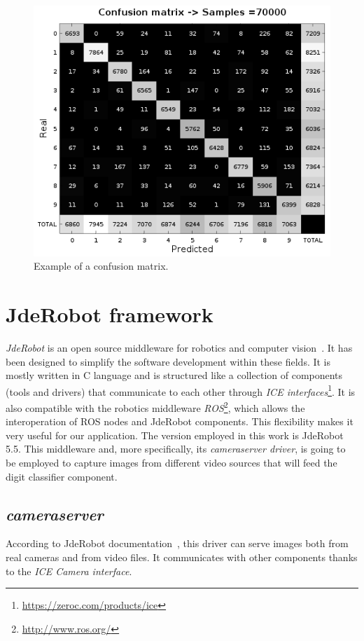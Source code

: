 \begin{figure}
	\centering
	\includegraphics[width=0.8\linewidth, keepaspectratio]{figures/conf_mat.png}
	\caption{Example of a confusion matrix.}
	\label{fig:conf_mat}
\end{figure}

\section{JdeRobot framework}\label{sec:jderobot}
\emph{JdeRobot} is an open source middleware for robotics and computer vision~\cite{jderobot}. It has been designed to simplify the software development within these fields. It is mostly written in C\nolinebreak[4]\hspace{-.05em}\raisebox{.4ex}{\tiny\bf ++} language and is structured like a collection of components (tools and drivers) that communicate to each other through \emph{ICE interfaces}\footnote{\url{https://zeroc.com/products/ice}}. It is also compatible with the robotics middleware \emph{ROS}\footnote{\url{http://www.ros.org/}}, which allows the interoperation of ROS nodes and JdeRobot components. This flexibility makes it very useful for our application. The version employed in this work is JdeRobot 5.5. This middleware and, more specifically, its \emph{\textit{cameraserver} driver}, is going to be employed to capture images from different video sources that will feed the digit classifier component.

\subsection* {\textit{cameraserver}}
According to JdeRobot documentation~\cite{jderobot}, this driver can serve images both from real cameras and from video files. It communicates with other components thanks to the \emph{ICE \textit{Camera} interface}.

